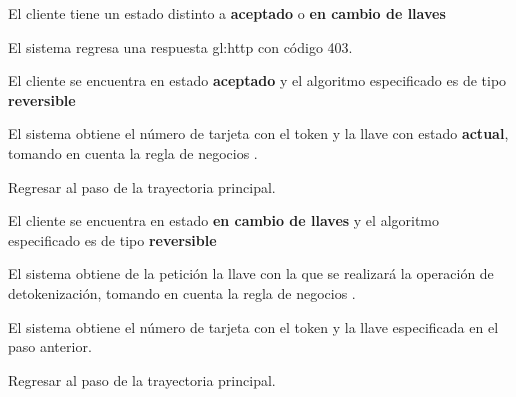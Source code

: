 {  \begin{trayectoriaAlternativa}
    {El cliente tiene un estado distinto a \textbf{aceptado} o
      \textbf{en cambio de llaves}}

    \item El sistema regresa una respuesta \gls{gl:http} con código 403.

  \end{trayectoriaAlternativa}


  \begin{trayectoriaAlternativa}
    {El cliente se encuentra en estado \textbf{aceptado} y el algoritmo
    especificado es de tipo \textbf{reversible}}

    \item El sistema obtiene el número de tarjeta con el token y la llave
      con estado \textbf{actual}, tomando en cuenta la regla de negocios
      .

    \item Regresar al paso  de la trayectoria
      principal.

  \end{trayectoriaAlternativa}


  \begin{trayectoriaAlternativa}
    {El cliente se encuentra en estado \textbf{en cambio de llaves} y el
    algoritmo especificado es de tipo \textbf{reversible}}

    \item El sistema obtiene de la petición la llave con la que se realizará
      la operación de detokenización, tomando en cuenta la regla de negocios
      .

    \item El sistema obtiene el número de tarjeta con el token y la llave
      especificada en el paso anterior.

    \item Regresar al paso  de la trayectoria
      principal.

  \end{trayectoriaAlternativa}

}
